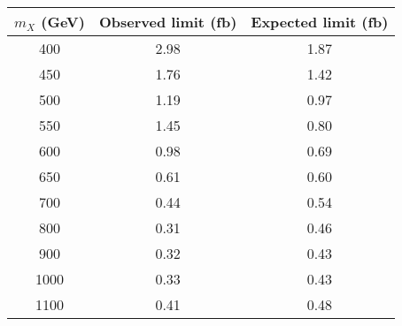 \begin{tabular}{ | c | c | c | }
\hline
$m_X$ (GeV) & Observed limit (fb) & Expected limit (fb) \\ \hline
400 & 2.98 & 1.87 \\
450 & 1.76 & 1.42 \\
500 & 1.19 & 0.97 \\
550 & 1.45 & 0.80 \\
600 & 0.98 & 0.69 \\
650 & 0.61 & 0.60 \\
700 & 0.44 & 0.54 \\
800 & 0.31 & 0.46 \\
900 & 0.32 & 0.43 \\
1000 & 0.33 & 0.43 \\
1100 & 0.41 & 0.48 \\ \hline
\end{tabular}
